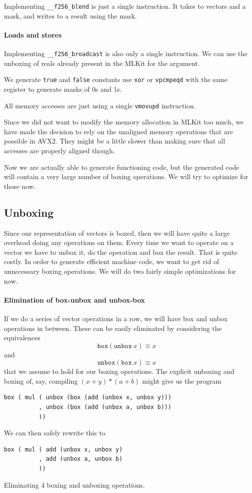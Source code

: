 \documentclass{article}
\begin{document}
Implementing \verb!__f256_blend! is just a single instruction. It takes to vectors and a mask, and writes to a result using the mask.

\paragraph{Loads and stores}

Implementing \verb!__f256_broadcast! is also only a single instruction. We can use the unboxing of reals already present in the MLKit for the argument.

We generate \verb!true! and \verb!false! constants use \verb!xor! or \verb!vpcmpeqd! with the same register to generate masks of 0s and 1s.

All memory accesses are just using a single \verb!vmovupd! instruction.

Since we did not want to modify the memory allocation in MLKit too much, we have made the decision to rely on the unaligned memory operations that are possible in AVX2. They might be a little slower than making sure that all accesses are properly aligned though.

Now we are actually able to generate functioning code, but the generated code will contain a very large number of boxing operations. We will try to optimize for those now.


\subsection{Unboxing}

Since our representation of vectors is boxed, then we will have quite a large overhead doing any operations on them. Every time we want to operate on a vector we have to unbox it, do the operation and box the result. That is quite costly. In order to generate efficient machine code, we want to get rid of unnecessary boxing operations. We will do two fairly simple optimizations for now.

\paragraph{Elimination of box-unbox and unbox-box}
If we do a series of vector operations in a row, we will have box and unbox operations in between. These can be easily eliminated by considering the equivalences
\[
    \mathtt{box} (\mathtt{unbox}\ x) \equiv x
\]
and
\[
    \mathtt{unbox} (\mathtt{box}\ x) \equiv x
\]
that we assume to hold for our boxing operations. The explicit unboxing and boxing of, say, compiling $(x + y) * (a + b)$ might give us the program 
\begin{verbatim}
box ( mul ( unbox (box (add (unbox x, unbox y)))
          , unbox (box (add (unbox a, unbox b)))
          ))
\end{verbatim}
We can then safely rewrite this to
\begin{verbatim}
box ( mul ( add (unbox x, unbox y)
          , add (unbox a, unbox b)
          ))
\end{verbatim}
Eliminating 4 boxing and unboxing operations.
\end{document}

